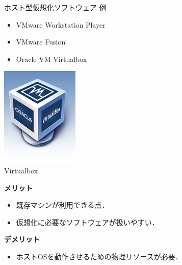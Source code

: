 \begin{frame}[t]{\ftitle}
    \begin{exampleblock}{ホスト型仮想化ソフトウェア 例}
        \begin{minipage}[b]{.8\textwidth}
            \begin{itemize}
                \setlength{\itemsep}{1em}
                \item VMware Workstation Player
                \item VMware Fusion
                \item Oracle VM Virtualbox
            \end{itemize}
        \end{minipage}
        \begin{minipage}[b]{.15\textwidth}
            \centering
            \includegraphics[keepaspectratio,width=.8\textwidth]{virtualbox_logo.png}\\
            {\tiny Virtualbox\cite{VMBox}}
        \end{minipage}
    \end{exampleblock}
    \begin{minipage}[t]{.48\textwidth}
        \textbf{メリット}
        \begin{itemize}
            \item 既存マシンが利用できる点．
            \item 仮想化に必要なソフトウェアが扱いやすい．
        \end{itemize}
    \end{minipage}
    \begin{minipage}[t]{.48\textwidth}
        \textbf{デメリット}
        \begin{itemize}
            \item ホストOSを動作させるための物理リソースが必要．
        \end{itemize}
    \end{minipage}\\
    \hfill\cite{itmanage}
\end{frame}
